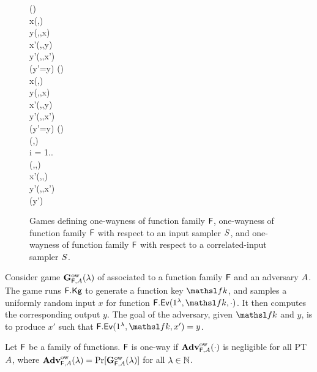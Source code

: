
\begin{figure}[t]
{
\vspace{-1.0em} %
  {
    \FKey\getsr\Kg{\FF}(\secIn)\\
    x\getsr\Dom{\FF}(\secParam,\FKey)\\
    y\gets\Ev{\FF}(\secIn,\FKey,x)\\
    x'\getsr\advA(\secIn,\FKey,y)\\
	y'\gets\Ev{\FF}(\secIn,\FKey,x')\\
    \pcreturn (y'=y)
  }
}
{
\vspace{-1.0em} %
  {
    \FKey\getsr\Kg{\FF}(\secIn)\\
    x\getsr\sampS(\secIn,\FKey)\\
    y\gets\Ev{\FF}(\secIn,\FKey,x)\\
    x'\getsr\advA(\secIn,\FKey,y)\\
	y'\gets\Ev{\FF}(\secIn,\FKey,x')\\
    \pcreturn (y'=y)
  }
}
{
\vspace{-1.0em} %
  {
    \FKey\getsr\Kg{\FF}(\secIn)\\
    \bx\getsr\sampS(\secIn,\FKey)\\
	\pcfor i = 1..\size{\bx} \pcdo \\
	\pcind \by[i]\gets\Ev{\FF}(\secIn,\FKey,\bx[i])\\
    x'\getsr\advA(\secIn,\FKey,\by)\\
	y'\gets\Ev{\FF}(\secIn,\FKey,x')\\
    \pcreturn (y'\in\by)
  }
}
\figvspace
\caption{Games defining
           one-wayness of function family $\mathsf{F}$,
		   one-wayness of function family $\mathsf{F}$ with respect to an input sampler $S$,
		   and one-wayness of function family $\mathsf{F}$ with respect to a correlated-input sampler $S$.}
\label{fig-sample-game}
\label{fig-ff-ow}
\label{fig-ff-sow}
\label{fig-ff-msow}
\hrulefill
\end{figure}

Consider game $\mathbf{G}^{\rm ow}_{\mathsf{F},A}(\lambda)$ of  associated to a function family $\mathsf{F}$ and an adversary $A$.
The game runs $\mathsf{F}.\mathsf{Kg}$ to generate a function key $\FKey$, and samples a uniformly random input $x$ for function $\Ev{\FF}(\secIn,\FKey,\cdot)$.
It then computes the corresponding output $y$.
The goal of the adversary, given $\FKey$ and $y$, is to produce $x'$ such that $\Ev{\FF}(\secIn,\FKey,x') = y$.
\begin{defn}
  Let $\mathsf{F}$ be a family of functions.
  $\mathsf{F}$ is one-way if $\mathbf{Adv}^{\rm ow}_{\mathsf{F},A}(\cdot)$ is negligible for all PT $A$,
  where $\mathbf{Adv}^{\rm ow}_{\mathsf{F},A}(\lambda)=\Pr[\mathbf{G}^{\rm ow}_{\mathsf{F},A}(\lambda)]$ for all $\lambda\in{{\mathbb N}}$.
\end{defn}

